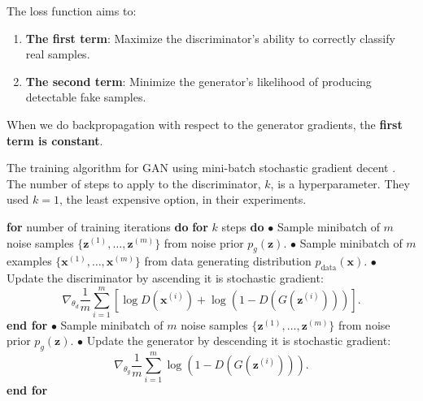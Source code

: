 The loss function aims to:

\begin{enumerate}
    \item \textbf{The first term}: Maximize the discriminator's ability to correctly classify real samples.
    \item \textbf{The second term}: Minimize the generator's likelihood of producing detectable fake samples.
\end{enumerate}

When we do backpropagation with respect to the generator gradients, the \textbf{first term is constant}.








\begin{algorithm}
    \caption{The training algorithm for GAN using mini-batch stochastic gradient decent \cite{gan}. The number of steps to apply to the discriminator, $k$, is a hyperparameter. They used $k = 1$, the least expensive option, in their experiments.} 
    \label{alg:gan_training}
    \begin{algorithmic}
        \State \textbf{for} number of training iterations \textbf{do}
        \State \quad \textbf{for} $k$ steps \textbf{do}
        \Statex \qquad $\bullet$ Sample minibatch of $m$ noise samples $\{ \mathbf{z}^{(1)}, \dots, \mathbf{z}^{(m)} \}$ from noise prior $p_g(\mathbf{z})$.
        \Statex \qquad $\bullet$ Sample minibatch of $m$ examples $\{ \mathbf{x}^{(1)}, \dots, \mathbf{x}^{(m)} \}$ from data generating distribution $p_{\text{data}}(\mathbf{x})$.
        \Statex \qquad $\bullet$ Update the discriminator by ascending it is stochastic gradient:
        \Statex
        \[
        \nabla_{\theta_d} \frac{1}{m} \sum_{i=1}^{m} \left[ \log D \left( \mathbf{x}^{(i)} \right) + \log \left( 1 - D \left( G \left( \mathbf{z}^{(i)} \right) \right) \right) \right] .
        \]
        \State \quad \textbf{end for}
        \Statex \quad $\bullet$ Sample minibatch of $m$ noise samples $\{ \mathbf{z}^{(1)}, \dots, \mathbf{z}^{(m)} \}$ from noise prior $p_g(\mathbf{z})$.
        \Statex \quad $\bullet$ Update the generator by descending it is stochastic gradient:
        \Statex
        \[
        \nabla_{\theta_g} \frac{1}{m} \sum_{i=1}^{m} \log \left( 1 - D \left( G \left( \mathbf{z}^{(i)} \right) \right) \right) .
        \]
        \State \textbf{end for}
    \end{algorithmic}
\end{algorithm}







